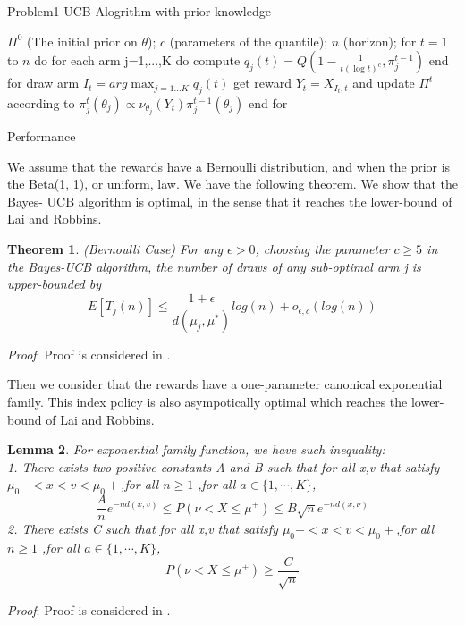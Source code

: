\documentclass[letterpaper,12pt]{article}
\begin{document}
\begin{section}{Problem1 UCB Alogrithm with prior knowledge}
    \begin{algorithm}[htb]  
      \caption{Bayes-UCB}  
      \label{alg:Bayes-UCB}  
      \begin{algorithmic}[1]  
        \Require  
          $\Pi^0$ (The initial prior on $\theta$);
          $c$ (parameters of the quantile); 
          $n$ (horizon);  
        \State for $t=1$ to $n$ do  
        \State \quad for each arm j=1,...,K do
        \State \quad \quad compute 
        \State \quad \quad \quad $q_j(t)=Q(1-\frac{1}{t(\log t)^c},\pi_j^{t-1})$
        \State \quad end for 
        \State \quad draw arm $I_t=arg \max_{j=1...K}q_j(t)$ 
        \State \quad get reward $Y_t=X_{I_t,t}$ and update $\Pi^t$ according to $\pi^t_j(\theta_j)\propto \nu_{\theta_j}(Y_t)\pi_j^{t-1}(\theta_j) $
        \State end for
      \end{algorithmic}  
    \end{algorithm}  

    \begin{subsection}{Performance}
    \newtheorem{theorem}{Theorem}[section]
    \newtheorem{lemma}[theorem]{Lemma}
        We assume that the rewards have a Bernoulli distribution, and when the prior is the Beta(1, 1), or uniform, law. We have the following theorem. We show that the Bayes- UCB algorithm is optimal, in the sense that it reaches the lower-bound of Lai and Robbins.
        \begin{theorem}{(Bernoulli Case)}
          For any $\epsilon>0$, choosing the parameter $c\ge 5$ in the Bayes-UCB algorithm, the number of draws of any sub-optimal arm j is upper-bounded by $$E[T_j(n)]\le \frac{1+\epsilon}{d(\mu_j,\mu^*)}log(n)+o_{\epsilon,c}(log(n))$$
        \end{theorem}
        \emph{Proof}: Proof is considered in \cite{Kaufmann2012On}.

        Then we consider that the rewards have a one-parameter canonical exponential family. This index policy is also asympotically optimal which reaches the lower-bound of Lai and Robbins. 

        \begin{lemma}
         For exponential family function, we have such inequality:\\
         1. There exists two positive constants A and B such that for all x,v that satisfy $\mu_0- < x <v <\mu_0+ $,for all $n \ge 1$ ,for all $a\in \{1,\cdots,K\}$,
         $$\frac{A}{n}e^{-nd(x,v)} \le P(\nu<X\le\mu^+) \le B \sqrt n e^{-nd(x,\nu)}$$
         2. There exists C such that for all x,v that satisfy $\mu_0- < x <v <\mu_0+ $,for all $n \ge 1$ ,for all $a\in \{1,\cdots,K\}$,
         $$P(\nu<X\le\mu^+)\ge \frac{C}{\sqrt n}$$
        \end{lemma}
        \emph{Proof}: Proof is considered in \cite{Kaufmann2016On}.


\end{subsection}
\end{section}
\end{document}
